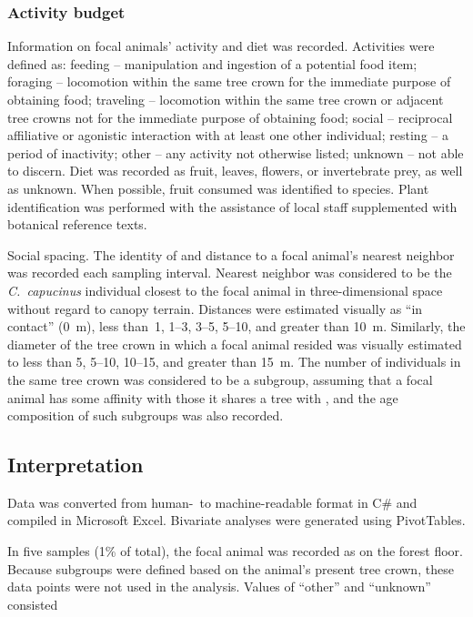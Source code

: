 \documentclass[american]{../../../coursework}
\begin{document}
\subsubsection{Activity budget}

Information on focal animals' activity and diet was recorded. Activities were
defined as: feeding -- manipulation and ingestion of a potential food item;
foraging -- locomotion within the same tree crown for the immediate purpose of
obtaining food; traveling -- locomotion within the same tree crown or adjacent
tree crowns not for the immediate purpose of obtaining food; social --
reciprocal affiliative or agonistic interaction with at least one other
individual; resting -- a period of inactivity; other -- any activity not
otherwise listed; unknown -- not able to discern. Diet was recorded as fruit,
leaves, flowers, or invertebrate prey, as well as unknown. When possible,
fruit consumed was identified to species. Plant identification was performed
with the assistance of local staff supplemented with botanical reference texts.

Social spacing. The identity of and distance to a focal animal's nearest
neighbor was recorded each sampling interval. Nearest neighbor was considered
to be the \emph{C.~capucinus} individual closest to the focal animal in
three-dimensional space without regard to canopy terrain. Distances were
estimated visually as ``in contact'' (\SI{0}{\metre}), less than~1,
\numrange{1}{3}, \numrange{3}{5}, \numrange{5}{10}, and greater than
\SI{10}{\metre}. Similarly, the diameter of the tree crown in which a focal
animal resided was visually estimated to less than 5, \numrange{5}{10},
\numrange{10}{15}, and greater than \SI{15}{\metre}. The number of individuals
in the same tree crown was considered to be a subgroup, assuming that a focal
animal has some affinity with those it shares a tree with
\parencite{Bezanson2008}, and the age composition of such subgroups was also
recorded.

\subsection{Interpretation}

Data was converted from human-\ to machine-readable format in C\# and compiled
in Microsoft Excel. Bivariate analyses were generated using PivotTables.

In five samples (1\% of total), the focal animal was recorded as on the forest
floor. Because subgroups were defined based on the animal's present tree crown,
these data points were not used in the analysis. Values of ``other'' and
``unknown'' consisted
\end{document}
